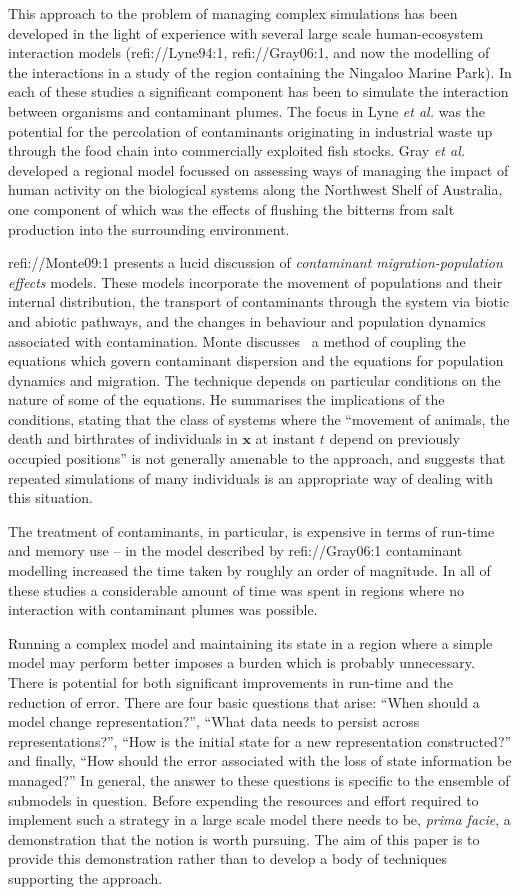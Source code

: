 \documentclass{article}
\newcommand{\tmem}[1]{{\em #1\/}}
\newcommand{\tmmathbf}[1]{\ensuremath{\boldsymbol{#1}}}
\begin{document}
This approach to the problem of managing complex simulations has been
developed in the light of experience with several large scale human-ecosystem
interaction models (refi://Lyne94:1, refi://Gray06:1, and now the modelling of
the interactions in a study of the region containing the Ningaloo Marine
Park). In each of these studies a significant component has been to simulate
the interaction between organisms and contaminant plumes. The focus in Lyne
{\tmem{et al.}} was the potential for the percolation of contaminants
originating in industrial waste up through the food chain into commercially
exploited fish stocks. Gray {\tmem{et al.}} developed a regional model
focussed on assessing ways of managing the impact of human activity on the
biological systems along the Northwest Shelf of Australia, one component of
which was the effects of flushing the bitterns from salt production into the
surrounding environment.

refi://Monte09:1 presents a lucid discussion of {\tmem{contaminant
migration-population effects}} models. These models incorporate the movement
of populations and their internal distribution, the transport of contaminants
through the system via biotic and abiotic pathways, and the changes in
behaviour and population dynamics associated with contamination. Monte
discusses \ a method of coupling the equations which govern contaminant
dispersion and the equations for population dynamics and migration. The
technique depends on particular conditions on the nature of some of the
equations. He summarises the implications of the conditions, stating that the
class of systems where the ``movement of animals, the death and birthrates of
individuals in $\tmmathbf{x}$ at instant $t$ depend on previously occupied
positions'' is not generally amenable to the approach, and suggests that
repeated simulations of many individuals is an appropriate way of dealing with
this situation.

The treatment of contaminants, in particular, is expensive in terms of
run-time and memory use -- in the model described by refi://Gray06:1
contaminant modelling increased the time taken by roughly an order of
magnitude. In all of these studies a considerable amount of time was spent in
regions where no interaction with contaminant plumes was possible.

Running a complex model and maintaining its state in a region where a simple
model may perform better imposes a burden which is probably unnecessary. There
is potential for both significant improvements in run-time and the reduction
of error. There are four basic questions that arise: ``When should a model
change representation?'', ``What data needs to persist across
representations?'', ``How is the initial state for a new representation
constructed?'' and finally, ``How should the error associated with the loss of
state information be managed?'' In general, the answer to these questions is
specific to the ensemble of submodels in question. Before expending the
resources and effort required to implement such a strategy in a large scale
model there needs to be, {\tmem{prima facie}}, a demonstration that the notion
is worth pursuing. The aim of this paper is to provide this demonstration
rather than to develop a body of techniques supporting the approach.
\end{document}
